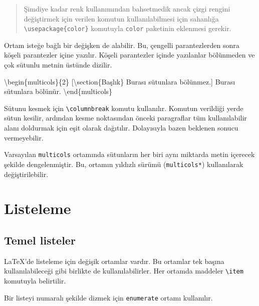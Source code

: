 \documentclass[
  10pt,
]{scrbook}
\newenvironment{Shaded}{\begin{snugshade}}{\end{snugshade}}
\newcommand{\DecValTok}[1]{\textcolor[rgb]{0.00,0.00,0.81}{#1}}
\newcommand{\NormalTok}[1]{#1}
\begin{document}
\begin{quote}
Şimdiye kadar renk kullanımından bahsetmedik ancak çizgi rengini
değiştirmek için verilen komutun kullanılabilmesi için sahanlığa
\texttt{\textbackslash{}usepackage\{color\}} komutuyla \texttt{color} paketinin eklenmesi gerekir.
\end{quote}

Ortam isteğe bağlı bir değişken de alabilir. Bu, çengelli parantezlerden
sonra köşeli parantezler içine yazılır. Köşeli parantezler içinde
yazılanlar bölünmeden ve çok sütunlu metnin üstünde dizilir.

\begin{Shaded}
\begin{Highlighting}[]
\NormalTok{\textbackslash{}begin\{multicols\}\{}\DecValTok{2}\NormalTok{\}}
\NormalTok{[\textbackslash{}section\{Başlık\}}
\NormalTok{Burası sütunlara bölünmez.]}
\NormalTok{Burası sütunlara bölünür.}
\NormalTok{\textbackslash{}end\{multicols\}}
\end{Highlighting}
\end{Shaded}

Sütunu kesmek için \texttt{\textbackslash{}columnbreak} komutu kullanılır. Komutun verildiği
yerde sütun kesilir, ardından kesme noktasından önceki paragraflar tüm
kullanılabilir alanı doldurmak için eşit olarak dağıtılır. Dolayısıyla
bazen beklenen sonucu vermeyebilir.

Varsayılan \texttt{multicols} ortamında sütunların her biri aynı miktarda metin
içerecek şekilde dengelenmiştir. Bu, ortamın yıldızlı sürümü
(\texttt{multicols*}) kullanılarak değiştirilebilir.

\hypertarget{listeleme}{%
\section{Listeleme}\label{listeleme}}

\hypertarget{temel-listeler}{%
\subsection{Temel listeler}\label{temel-listeler}}

LaTeX'de listeleme için değişik ortamlar vardır. Bu ortamlar tek başına
kullanılabileceği gibi birlikte de kullanılabilirler. Her ortamda
maddeler \texttt{\textbackslash{}item} komutuyla belirtilir.

Bir listeyi numaralı şekilde dizmek için \texttt{enumerate} ortamı kullanılır.
\end{document}
